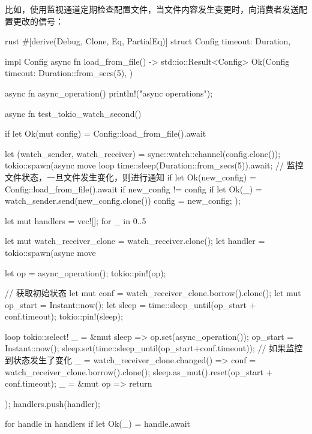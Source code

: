 比如，使用监视通道定期检查配置文件，当文件内容发生变更时，向消费者发送配置更改的信号：
\begin{code-block}{rust}
#[derive(Debug, Clone, Eq, PartialEq)]
struct Config {
    timeout: Duration,
}

impl Config {
    async fn load_from_file() -> std::io::Result<Config> {
        Ok(Config {
            timeout: Duration::from_secs(5),
        })
    }
}

async fn async_operation() {
    println!("async operations");
}

async fn test_tokio_watch_second() {
    if let Ok(mut config) = Config::load_from_file().await {
        let (watch_sender, watch_receiver) = sync::watch::channel(config.clone());
        tokio::spawn(async move {
            loop {
                time::sleep(Duration::from_secs(5)).await;
                // 监控文件状态，一旦文件发生变化，则进行通知
                if let Ok(new_config) = Config::load_from_file().await {
                    if new_config != config {
                        if let Ok(_) = watch_sender.send(new_config.clone()) {
                            config = new_config;
                        }
                    }
                }
            }
        });

        let mut handlers = vec![];
        for _ in 0..5 {
            let mut watch_receiver_clone = watch_receiver.clone();
            let handler = tokio::spawn(async move {
                let op = async_operation();
                tokio::pin!(op);

                // 获取初始状态
                let mut conf = watch_receiver_clone.borrow().clone();
                let mut op_start = Instant::now();
                let sleep = time::sleep_until(op_start + conf.timeout);
                tokio::pin!(sleep);

                loop {
                    tokio::select! {
                        _ = &mut sleep => {
                            op.set(async_operation());
                            op_start = Instant::now();
                            sleep.set(time::sleep_until(op_start+conf.timeout));
                        }
                        // 如果监控到状态发生了变化
                        _ = watch_receiver_clone.changed() => {
                            conf = watch_receiver_clone.borrow().clone();
                            sleep.as_mut().reset(op_start + conf.timeout);
                        }
                        _ = &mut op => {
                            return
                        }
                    }
                }
            });
            handlers.push(handler);
        }

        for handle in handlers {
            if let Ok(_) = handle.await {}
        }
    }
}
\end{code-block}

